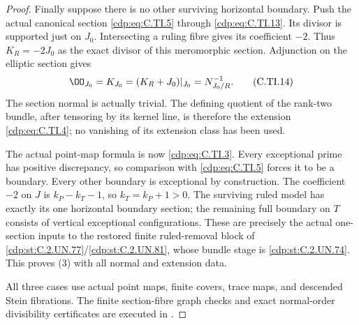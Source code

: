 \begin{proof}
Finally suppose there is no other
surviving horizontal boundary.
Push the actual canonical section
\eqref{cdp:eq:C.TI.5} through \eqref{cdp:eq:C.TI.13}.
Its divisor is supported just on
\(J_0\). Intersecting a ruling
fibre gives its coefficient \(-2\).
Thus \(K_R=-2J_0\) as the exact
divisor of this meromorphic
section. Adjunction on the
elliptic section gives
\[
 \OO_{J_0}=K_{J_0}
          =(K_R+J_0)|_{J_0}=N_{J_0/R}^{-1}.
 \tag{C.TI.14}\label{cdp:eq:C.TI.14}
\]
The section normal is actually
trivial. The defining quotient
of the rank-two bundle, after
tensoring by its kernel line,
is therefore the extension
\eqref{cdp:eq:C.TI.4}; no vanishing of its
extension class has been used.

The actual point-map formula is
now \eqref{cdp:eq:C.TI.3}. Every exceptional
prime has positive discrepancy,
so comparison with \eqref{cdp:eq:C.TI.5}
forces it to be a boundary.
Every other boundary is
exceptional by construction.
The coefficient \(-2\) on \(J\)
is \(k_P-k_T-1\), so
\(k_T=k_P+1>0\). The surviving
ruled model has exactly its
one horizontal boundary section;
the remaining full boundary on
\(T\) consists of vertical
exceptional configurations.
These are precisely the actual
one-section inputs to the
restored finite ruled-removal
block of \ref{cdp:st:C.2.UN.77}/\ref{cdp:st:C.2.UN.81}, whose
bundle stage is \ref{cdp:st:C.2.UN.74}.
This proves (3) with all
normal and extension data.

All three cases use actual point
maps, finite covers, trace maps,
and descended Stein fibrations.
The finite section-fibre graph
checks and exact normal-order
divisibility certificates are
executed in
.
\end{proof}


